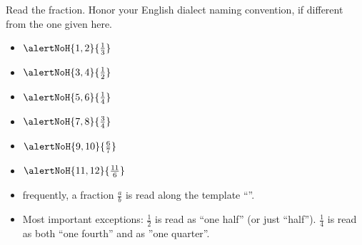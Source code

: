 \begin{frame}
\begin{example}
 {Read the fraction.} Honor your English dialect naming convention, if different from the one given here.
\begin{itemize}
\item $\alertNoH{1,2}{\frac{1}{3}}$ 
\item $\alertNoH{3,4}{\frac{1}{2}}$ 
\item $\alertNoH{5,6}{\frac{1}{4}}$ 
\item $\alertNoH{7,8}{\frac{3}{4}}$ 
\item $\alertNoH{9,10}{\frac{6}{7}}$ 
\item $\alertNoH{11,12}{\frac{11}{6}}$ 

\end{itemize}
\end{example}


\begin{itemize}
\item<13->  frequently, a fraction $\frac{a}{b}$ is read along the template ``''.
\item<15-> Most important exceptions: $\displaystyle \frac{1}{2}$ is read as ``one half'' (or just ``half''). $\displaystyle \frac{1}{4}$ is read as both ``one fourth'' and as ''one quarter''. 
\end{itemize}

\end{frame}